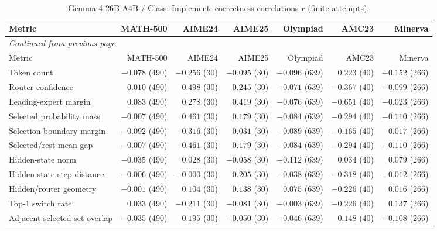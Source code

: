 \begingroup\scriptsize\setlength{\tabcolsep}{4pt}
\begin{longtable}{@{}lrrrrrr@{}}
\caption{Gemma-4-26B-A4B / Class: Implement: correctness correlations $r$ (finite attempts).}\label{tab:multi-gemma-class-Implement}\\
\toprule
Metric & MATH-500 & AIME24 & AIME25 & Olympiad & AMC23 & Minerva \\
\midrule\endfirsthead
\multicolumn{7}{l}{\textit{Continued from previous page}}\\
\toprule
Metric & MATH-500 & AIME24 & AIME25 & Olympiad & AMC23 & Minerva \\
\midrule\endhead
\bottomrule\endfoot
Token count & $-0.078$ (490) & $-0.256$ (30) & $-0.095$ (30) & $-0.096$ (639) & $0.223$ (40) & $-0.152$ (266) \\
Router confidence & $0.010$ (490) & $0.498$ (30) & $0.245$ (30) & $-0.071$ (639) & $-0.367$ (40) & $-0.099$ (266) \\
Leading-expert margin & $0.083$ (490) & $0.278$ (30) & $0.419$ (30) & $-0.076$ (639) & $-0.651$ (40) & $-0.023$ (266) \\
Selected probability mass & $-0.007$ (490) & $0.461$ (30) & $0.179$ (30) & $-0.084$ (639) & $-0.294$ (40) & $-0.110$ (266) \\
Selection-boundary margin & $-0.092$ (490) & $0.316$ (30) & $0.031$ (30) & $-0.089$ (639) & $-0.165$ (40) & $0.017$ (266) \\
Selected/rest mean gap & $-0.007$ (490) & $0.461$ (30) & $0.179$ (30) & $-0.084$ (639) & $-0.294$ (40) & $-0.110$ (266) \\
Hidden-state norm & $-0.035$ (490) & $0.028$ (30) & $-0.058$ (30) & $-0.112$ (639) & $0.034$ (40) & $0.079$ (266) \\
Hidden-state step distance & $-0.006$ (490) & $-0.000$ (30) & $0.205$ (30) & $-0.038$ (639) & $-0.318$ (40) & $-0.012$ (266) \\
Hidden/router geometry & $-0.001$ (490) & $0.104$ (30) & $0.138$ (30) & $0.075$ (639) & $-0.226$ (40) & $0.016$ (266) \\
Top-1 switch rate & $0.033$ (490) & $-0.211$ (30) & $-0.081$ (30) & $-0.003$ (639) & $-0.226$ (40) & $0.137$ (266) \\
Adjacent selected-set overlap & $-0.035$ (490) & $0.195$ (30) & $-0.050$ (30) & $-0.046$ (639) & $0.148$ (40) & $-0.108$ (266) \\
\end{longtable}\endgroup

